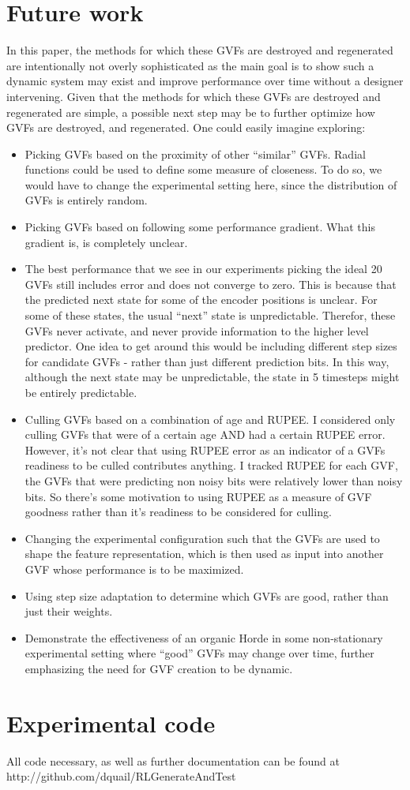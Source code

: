\documentclass[letterpaper]{article}
\begin{document}
\section{Future work}
In this paper, the methods for which these GVFs are destroyed and regenerated are intentionally not overly sophisticated as the main goal is to show such a dynamic system may exist and improve performance over time without a designer intervening. Given that the methods for which these GVFs are destroyed and regenerated are simple, a possible next step may be to further optimize how GVFs are destroyed, and regenerated. One could easily imagine exploring:
\begin{itemize}
  \item Picking GVFs based on the proximity of other ``similar'' GVFs. Radial functions could be used to define some measure of closeness. To do so, we would have to change the experimental setting here, since the distribution of GVFs is entirely random. 
  \item Picking GVFs based on following some performance gradient. What this gradient is, is completely unclear.  
  \item The best performance that we see in our experiments picking the ideal 20 GVFs still includes error and does not converge to zero. This is because that the predicted next state for some of the encoder positions is unclear. For some of these states, the usual ``next'' state is unpredictable. Therefor, these GVFs never activate, and never provide information to the higher level predictor. One idea to get around this would be including different step sizes for candidate GVFs - rather than just different prediction bits. In this way, although the next state may be unpredictable, the state in 5 timesteps might be entirely predictable. 
  \item Culling GVFs based on a combination of age and RUPEE. I considered only culling GVFs that were of a certain age AND had a certain RUPEE error. However, it's not clear that using RUPEE error as an indicator of a GVFs readiness to be culled contributes anything. I tracked RUPEE for each GVF, the GVFs that were predicting non noisy bits were relatively lower than noisy bits. So there's some motivation to using RUPEE as a measure of GVF goodness rather than it's readiness to be considered for culling.
  \item Changing the experimental configuration such that the GVFs are used to shape the feature representation, which is then used as input into another GVF whose performance is to be maximized.
  \item Using step size adaptation to determine which GVFs are good, rather than just their weights.
  \item Demonstrate the effectiveness of an organic Horde in some non-stationary experimental setting where ``good'' GVFs may change over time, further emphasizing the need for GVF creation to be \cite{White:2015} dynamic.
\end{itemize}

\section{Experimental code}
All code necessary, as well as further documentation can be found at http://github.com/dquail/RLGenerateAndTest



\end{document}
